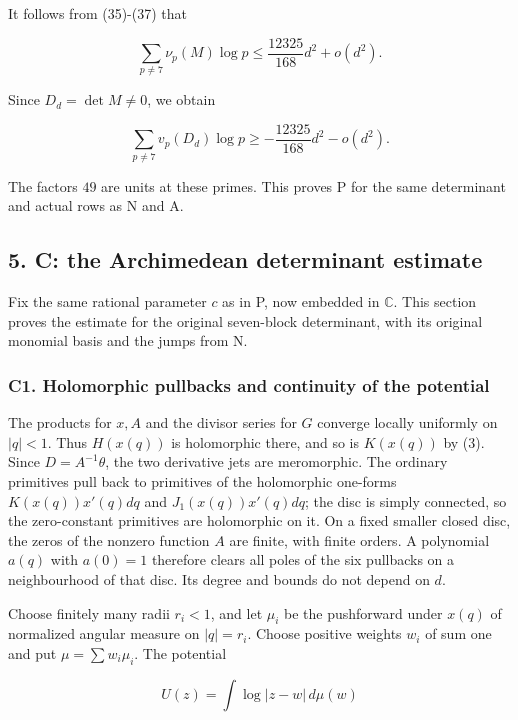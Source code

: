\documentclass[11pt,a4paper]{article}
\begin{document}
It follows from (35)-(37) that

\[
\sum_{p\ne7}\nu_p(M)\log p
\le\frac{12325}{168}d^2+o(d^2).
\]

Since \(D_d=\operatorname{det} M≠0\), we obtain

\[
\sum_{p\ne7}v_p(D_d)\log p
\ge-\frac{12325}{168}d^2-o(d^2).\tag{P}
\]

The factors \(49\) are units at these primes. This proves P for the same determinant and actual rows as N and A.

\hypertarget{c-the-archimedean-determinant-estimate}{%
\subsection{5. C: the Archimedean determinant estimate}\label{c-the-archimedean-determinant-estimate}}

Fix the same rational parameter \(c\) as in P, now embedded in \(\mathbb{C}\). This section proves the estimate for the original seven-block determinant, with its original monomial basis and the jumps from N.

\hypertarget{c1.-holomorphic-pullbacks-and-continuity-of-the-potential}{%
\subsubsection{C1. Holomorphic pullbacks and continuity of the potential}\label{c1.-holomorphic-pullbacks-and-continuity-of-the-potential}}

The products for \(x,A\) and the divisor series for \(G\) converge locally uniformly on \(|q|<1\). Thus \(H(x(q))\) is holomorphic there, and so is \(K(x(q))\) by (3). Since \(D=A^{-1}θ\), the two derivative jets are meromorphic. The ordinary primitives pull back to primitives of the holomorphic one-forms \(K(x(q))x'(q)dq\) and \(J_{1}(x(q))x'(q)dq\); the disc is simply connected, so the zero-constant primitives are holomorphic on it. On a fixed smaller closed disc, the zeros of the nonzero function \(A\) are finite, with finite orders. A polynomial \(a(q)\) with \(a(0)=1\) therefore clears all poles of the six pullbacks on a neighbourhood of that disc. Its degree and bounds do not depend on \(d\).

Choose finitely many radii \(r_i<1\), and let \(μ_i\) be the pushforward under \(x(q)\) of normalized angular measure on \(|q|=r_i\). Choose positive weights \(w_i\) of sum one and put \(μ=\sum w_iμ_i\). The potential

\[
U(z)=\int\log|z-w|\,d\mu(w)
\]
\end{document}
